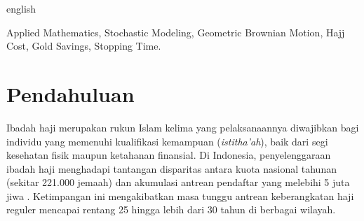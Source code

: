 \documentclass[journal,twoside]{IEEEtran}
\begin{document}
\begin{selectlanguage}{english}
\begin{abstract}
The prolonged waiting list for regular Hajj pilgrimages in Indonesia, ranging between 25 and 30 years, introduces significant financial exposure due to purchasing power erosion caused by operational cost inflation and currency depreciation. This study develops an applied mathematical modeling and stochastic simulation framework to assess the capital accumulation efficacy of physical gold savings relative to conventional fiat currency (IDR). The analytical framework is governed by three mathematical formulations: (1) foreign exchange rate forecasting (USD/IDR) via Holt's Linear Exponential Smoothing, (2) stochastic modeling of gold bullion asset prices via It\^o-type Stochastic Differential Equations under Geometric Brownian Motion (GBM) with 1,000-path Monte Carlo simulations, and (3) non-linear fitting of Hajj Operational Costs (BPIH) and Pilgrim Direct Out-of-Pocket Expenses (Bipih) using exponential and logistic growth functions. Discrete-time stopping criteria are formalized to quantify the time-to-threshold for initial quota registration ($\tau_{\text{DP}}$), total settlement ($\tau_{\text{lunas}}$), and departure realization ($\tau_{\text{berangkat}}$). Empirical findings reveal that gold's annualized drift ($\mu = 11.30\%$, $\sigma = 9.51\%$) reliably outpaces Bipih inflation ($g = 4.14\%$). At a monthly saving allocation of IDR 1,000,000, physical gold achieves settlement 14 months faster (4.8 years vs. 5.9 years) compared to cash, effectively providing purchasing power preservation across the multi-decade queue latency.
\end{abstract}

\begin{IEEEkeywords}
Applied Mathematics, Stochastic Modeling, Geometric Brownian Motion, Hajj Cost, Gold Savings, Stopping Time.
\end{IEEEkeywords}
\end{selectlanguage}

\section{Pendahuluan}
Ibadah haji merupakan rukun Islam kelima yang pelaksanaannya diwajibkan bagi individu yang memenuhi kualifikasi kemampuan (\textit{istitha'ah}), baik dari segi kesehatan fisik maupun ketahanan finansial. Di Indonesia, penyelenggaraan ibadah haji menghadapi tantangan disparitas antara kuota nasional tahunan (sekitar 221.000 jemaah) dan akumulasi antrean pendaftar yang melebihi 5 juta jiwa \cite{kemenag2024bpih}. Ketimpangan ini mengakibatkan masa tunggu antrean keberangkatan haji reguler mencapai rentang 25 hingga lebih dari 30 tahun di berbagai wilayah.
\end{document}
